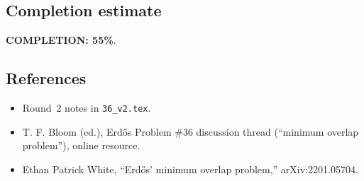 \subsection{Completion estimate}
\textbf{COMPLETION: 55\%}.

\subsection{References}
\begin{itemize}
\item Round~2 notes in \texttt{36\_v2.tex}.
\item T. F. Bloom (ed.), Erd\H{o}s Problem \#36 discussion thread (``minimum overlap problem''), online resource. 
\item Ethan Patrick White, ``Erd\H{o}s' minimum overlap problem,'' arXiv:2201.05704.
\end{itemize}

